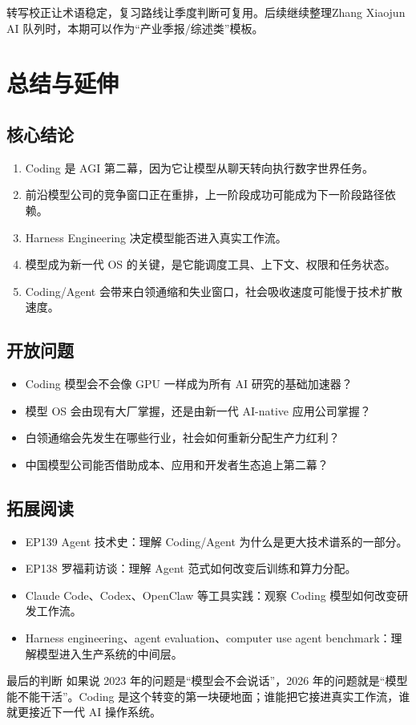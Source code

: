 \documentclass[a4paper]{article}
\begin{document}
转写校正让术语稳定，复习路线让季度判断可复用。后续继续整理Zhang Xiaojun AI 队列时，本期可以作为“产业季报/综述类”模板。

\section{总结与延伸}

\subsection{核心结论}

\begin{enumerate}
\item Coding 是 AGI 第二幕，因为它让模型从聊天转向执行数字世界任务。
\item 前沿模型公司的竞争窗口正在重排，上一阶段成功可能成为下一阶段路径依赖。
\item Harness Engineering 决定模型能否进入真实工作流。
\item 模型成为新一代 OS 的关键，是它能调度工具、上下文、权限和任务状态。
\item Coding/Agent 会带来白领通缩和失业窗口，社会吸收速度可能慢于技术扩散速度。
\end{enumerate}

\subsection{开放问题}

\begin{itemize}
\item Coding 模型会不会像 GPU 一样成为所有 AI 研究的基础加速器？
\item 模型 OS 会由现有大厂掌握，还是由新一代 AI-native 应用公司掌握？
\item 白领通缩会先发生在哪些行业，社会如何重新分配生产力红利？
\item 中国模型公司能否借助成本、应用和开发者生态追上第二幕？
\end{itemize}

\subsection{拓展阅读}

\begin{itemize}
\item EP139 Agent 技术史：理解 Coding/Agent 为什么是更大技术谱系的一部分。
\item EP138 罗福莉访谈：理解 Agent 范式如何改变后训练和算力分配。
\item Claude Code、Codex、OpenClaw 等工具实践：观察 Coding 模型如何改变研发工作流。
\item Harness engineering、agent evaluation、computer use agent benchmark：理解模型进入生产系统的中间层。
\end{itemize}

\begin{importantbox}{最后的判断}
如果说 2023 年的问题是“模型会不会说话”，2026 年的问题就是“模型能不能干活”。Coding 是这个转变的第一块硬地面；谁能把它接进真实工作流，谁就更接近下一代 AI 操作系统。
\end{importantbox}
\end{document}
